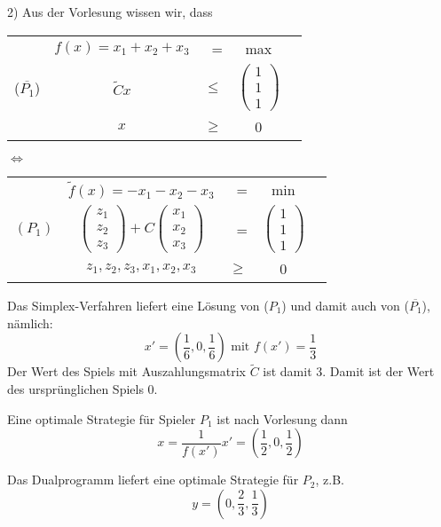 \documentclass[a4paper,11pt,twoside,titlepage]{article}
\begin{document}
2) Aus der Vorlesung wissen wir, dass\\
\begin{center}
\begin{tabular}{c|crcl|}\cline{2-5}
&$f(x)=x_1+x_2+x_3$&=&max&\\
($\overline{P_1}$)& $\widetilde{C}x$&$\leq$&$\left(\begin{array}{c}1\\1\\1\end{array}\right)$ &\\&$x$&$\geq$&0&\\\cline{2-5}
\end{tabular}
\end{center}
\begin{center}
$\Leftrightarrow$
\end{center}
\begin{center}
\begin{tabular}{c|crcl|}\cline{2-5}
&$\widetilde{f}(x)=-x_1-x_2-x_3$&=&min&\\
$(P_1)$&$\left(\begin{array}{c}z_1\\z_2\\z_3\end{array}\right)+C\left(\begin{array}{c}x_1\\x_2\\x_3\end{array}\right)$&=&$\left(\begin{array}{c}1\\1\\1\end{array}\right)$&\\
&$z_1,z_2,z_3,x_1,x_2,x_3$&$\geq$&0&\\\cline{2-5}
\end{tabular}
\end{center}
Das Simplex-Verfahren liefert eine Lösung von ($P_1$) und damit auch von ($\overline{P_1}$), nämlich:
\[x'=(\frac{1}{6},0,\frac{1}{6})\mbox{ mit }f(x')=\frac{1}{3}\]
Der Wert des Spiels mit Auszahlungsmatrix $\widetilde{C}$ ist damit 3. Damit ist der Wert des ursprünglichen Spiels 0.

Eine optimale Strategie für Spieler $P_1$ ist nach Vorlesung dann\\
\[x=\frac{1}{f(x')}x'=(\frac{1}{2},0,\frac{1}{2})\]

Das Dualprogramm liefert eine optimale Strategie für $P_2$, z.B. \[y=(0,\frac{2}{3},\frac{1}{3})\]
\end{document}
